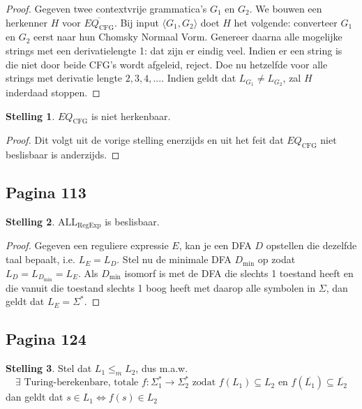\documentclass[kulak]{kulakarticle}
\newcommand{\CFG}{\text{CFG}}
\newcommand{\enc}[1]{\langle #1 \rangle}
\theoremstyle{definition}
\newtheorem*{stelling}{Stelling}
\begin{document}
	\begin{proof}
		Gegeven twee contextvrije grammatica's \(G_1\) en \(G_2\). We bouwen een herkenner \(H\) voor \(\overline{EQ_\CFG}\). Bij input \(\enc{G_1,G_2}\) doet \(H\) het volgende: converteer \(G_1\) en \(G_2\) eerst naar hun Chomsky Normaal Vorm. Genereer daarna alle mogelijke strings met een derivatielengte 1: dat zijn er eindig veel. Indien er een string is die niet door beide CFG's wordt afgeleid, reject. Doe nu hetzelfde voor alle strings met derivatie lengte \(2, 3, 4, ...\). Indien geldt dat \(L_{G_1} \neq L_{G_2}\), zal \(H\) inderdaad stoppen.
	\end{proof}

	\begin{stelling}
		\(EQ_\CFG\) is niet herkenbaar.
	\end{stelling}

	\begin{proof}
		Dit volgt uit de vorige stelling enerzijds en uit het feit dat \(EQ_\CFG\) niet beslisbaar is anderzijds.
	\end{proof}

	\subsection*{Pagina 113}

	\begin{stelling}
		\(\text{ALL}_\text{RegExp}\) is beslisbaar.
	\end{stelling}

	\begin{proof}
		Gegeven een reguliere expressie \(E\), kan je een DFA \(D\) opstellen die dezelfde taal bepaalt, i.e. \(L_E=L_D\). Stel nu de minimale DFA \(D_{\min}\) op zodat \(L_D=L_{D_{\min}}=L_E\). Als \(D_{\min}\) isomorf is met de DFA die slechts 1 toestand heeft en die vanuit die toestand slechts 1 boog heeft met daarop alle symbolen in \(\Sigma\), dan geldt dat \(L_E=\Sigma^*\).
	\end{proof}

	\subsection*{Pagina 124}

	\begin{stelling}
		Stel dat \(L_1 \leq_m L_2\), dus m.a.w. \[ \exists \text{ Turing-berekenbare, totale } f : \Sigma_1^*\to\Sigma_2^* \text{ zodat } f(L_1) \subseteq L_2 \text{ en } f(\overline{L_1}) \subseteq \overline{L_2} \] dan geldt dat \(s\in L_1 \Leftrightarrow f(s)\in L_2\)
	\end{stelling}
\end{document}

